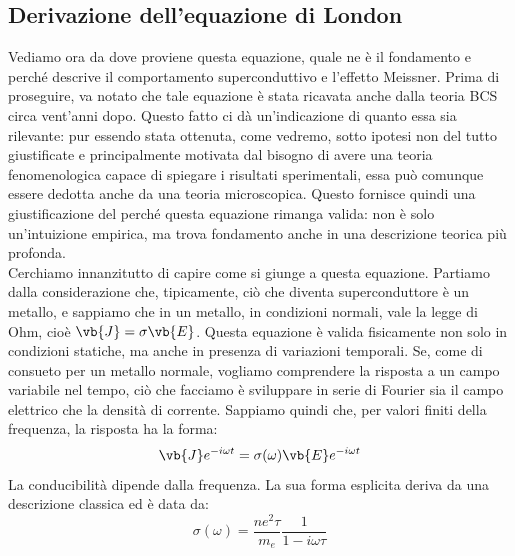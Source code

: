 \subsection{Derivazione dell'equazione di London}
Vediamo ora da dove proviene questa equazione, quale ne è il fondamento e perché descrive il comportamento superconduttivo e l'effetto Meissner. Prima di proseguire, va notato che tale equazione è stata ricavata anche dalla teoria BCS circa vent'anni dopo. Questo fatto ci dà un'indicazione di quanto essa sia rilevante: pur essendo stata ottenuta, come vedremo, sotto ipotesi non del tutto giustificate e principalmente motivata dal bisogno di avere una teoria fenomenologica capace di spiegare i risultati sperimentali, essa può comunque essere dedotta anche da una teoria microscopica. Questo fornisce quindi una giustificazione del perché questa equazione rimanga valida: non è solo un'intuizione empirica, ma trova fondamento anche in una descrizione teorica più profonda.\\
Cerchiamo innanzitutto di capire come si giunge a questa equazione.
Partiamo dalla considerazione che, tipicamente, ciò che diventa superconduttore è un metallo, e sappiamo che in un metallo, in condizioni normali, vale la legge di Ohm, cioè $\vb{J} = \sigma \vb{E}$. Questa equazione è valida fisicamente non solo in condizioni statiche, ma anche in presenza di variazioni temporali. Se, come di consueto per un metallo normale, vogliamo comprendere la risposta a un campo variabile nel tempo, ciò che facciamo è sviluppare in serie di Fourier sia il campo elettrico che la densità di corrente. Sappiamo quindi che, per valori finiti della frequenza, la risposta ha la forma:
\begin{equation}
   \vb{J} e^{-i\omega t}
   =\sigma(\omega) \vb{E} e^{-i\omega t}
   \label{eq:legge_di_Ohm_in_sviluppo_di_Fourier}
\end{equation}
La conducibilità dipende dalla frequenza. La sua forma esplicita deriva da una descrizione classica ed è data da:
\begin{equation*}
   \sigma(\omega)
   =\frac{n e^2 \tau}{m_e} \frac{1}{1 - i \omega \tau}
\end{equation*}
